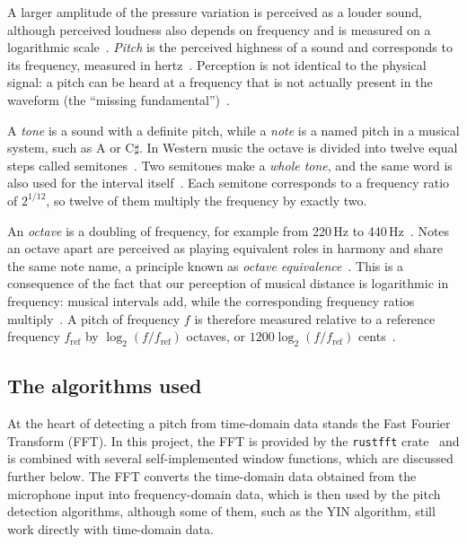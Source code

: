 A larger amplitude of the pressure variation is perceived as a louder
sound, although perceived loudness also depends on frequency and is
measured on a logarithmic scale~\cite[\S1.3, pp.~9--11]{benson2006music}.
\emph{Pitch} is the perceived highness of a sound and corresponds
to its frequency, measured in hertz~\cite[\S1.1, p.~2; \S1.3, p.~8]{benson2006music}.
Perception is not identical to the physical signal: a pitch can be heard
at a frequency that is not actually present in the waveform (the
``missing fundamental'')~\cite[\S1.1, p.~2]{benson2006music}.

A \emph{tone} is a sound with a definite pitch, while a \emph{note} is a
named pitch in a musical system, such as A or C$\sharp$. In Western music
the octave is divided into twelve equal steps called
semitones~\cite[App.~M, p.~389]{benson2006music}. Two semitones make a
\emph{whole tone}, and the same word is also used for the interval
itself~\cite[App.~M, p.~389]{benson2006music}. Each semitone corresponds
to a frequency ratio of $2^{1/12}$, so twelve of them multiply the
frequency by exactly two.

An \emph{octave} is a doubling of frequency, for example from 220\,Hz to
440\,Hz~\cite[\S4.2, p.~137]{benson2006music}. Notes an octave apart are
perceived as playing equivalent roles in harmony and share the same note
name, a principle known as \emph{octave
equivalence}~\cite[\S4.2, pp.~137--138; App.~M, p.~389]{benson2006music}.
This is a consequence of the fact that our perception of musical distance
is logarithmic in frequency: musical intervals add, while the
corresponding frequency ratios multiply~\cite[\S5.4, p.~157]{benson2006music}.
A pitch of frequency $f$ is therefore measured relative to a reference
frequency $f_{\mathrm{ref}}$ by $\log_2(f/f_{\mathrm{ref}})$ octaves, or
$1200\log_2(f/f_{\mathrm{ref}})$ cents~\cite[\S5.4, p.~158]{benson2006music}.

\subsection{The algorithms used}

At the heart of detecting a pitch from time-domain data stands the Fast
Fourier Transform (FFT). In this project, the FFT is provided by the
\texttt{rustfft} crate~\cite{rustfft} and is combined with several
self-implemented window functions, which are discussed further below. The FFT
converts the time-domain data obtained from the microphone input into
frequency-domain data, which is then used by the pitch detection algorithms,
although some of them, such as the YIN algorithm, still work directly with
time-domain data.

